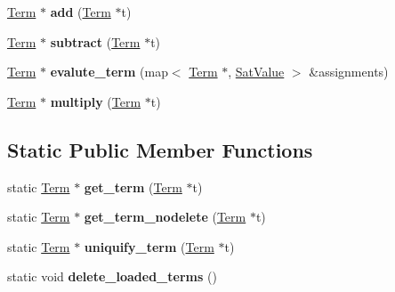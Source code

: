 \begin{DoxyCompactItemize}
\item 
\hypertarget{classTerm_a87af3d4bb0b9233c14ec51550d5271db}{\hyperlink{classTerm}{\-Term} $\ast$ {\bfseries add} (\hyperlink{classTerm}{\-Term} $\ast$t)}\label{classTerm_a87af3d4bb0b9233c14ec51550d5271db}

\item 
\hypertarget{classTerm_add8b115657cd9981f3a849e132253523}{\hyperlink{classTerm}{\-Term} $\ast$ {\bfseries subtract} (\hyperlink{classTerm}{\-Term} $\ast$t)}\label{classTerm_add8b115657cd9981f3a849e132253523}

\item 
\hypertarget{classTerm_abce229c606237df1e1ea4c546d0253da}{\hyperlink{classTerm}{\-Term} $\ast$ {\bfseries evalute\-\_\-term} (map$<$ \hyperlink{classTerm}{\-Term} $\ast$, \hyperlink{classSatValue}{\-Sat\-Value} $>$ \&assignments)}\label{classTerm_abce229c606237df1e1ea4c546d0253da}

\item 
\hypertarget{classTerm_a049329c5989dcb2587947806ac9c63ac}{\hyperlink{classTerm}{\-Term} $\ast$ {\bfseries multiply} (\hyperlink{classTerm}{\-Term} $\ast$t)}\label{classTerm_a049329c5989dcb2587947806ac9c63ac}

\end{DoxyCompactItemize}
\subsection*{\-Static \-Public \-Member \-Functions}
\begin{DoxyCompactItemize}
\item 
\hypertarget{classTerm_a67a37dab80c22a0ad179745522e4684d}{static \hyperlink{classTerm}{\-Term} $\ast$ {\bfseries get\-\_\-term} (\hyperlink{classTerm}{\-Term} $\ast$t)}\label{classTerm_a67a37dab80c22a0ad179745522e4684d}

\item 
\hypertarget{classTerm_af00fe6e59c07b99ecb1598b604b8ad34}{static \hyperlink{classTerm}{\-Term} $\ast$ {\bfseries get\-\_\-term\-\_\-nodelete} (\hyperlink{classTerm}{\-Term} $\ast$t)}\label{classTerm_af00fe6e59c07b99ecb1598b604b8ad34}

\item 
\hypertarget{classTerm_aa80cc2a16f137a15c1897509fcedff08}{static \hyperlink{classTerm}{\-Term} $\ast$ {\bfseries uniquify\-\_\-term} (\hyperlink{classTerm}{\-Term} $\ast$t)}\label{classTerm_aa80cc2a16f137a15c1897509fcedff08}

\item 
\hypertarget{classTerm_ae4db8c34d91b562ecbdbebddfc47c12b}{static void {\bfseries delete\-\_\-loaded\-\_\-terms} ()}\label{classTerm_ae4db8c34d91b562ecbdbebddfc47c12b}

\end{DoxyCompactItemize}
